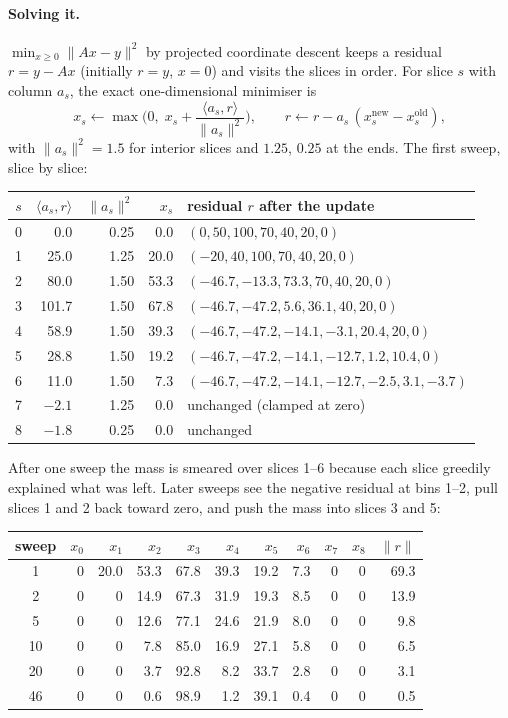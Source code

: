 \documentclass[11pt]{article}
\begin{document}
\paragraph{Solving it.} $\min_{x\ge0}\|Ax-y\|^2$ by projected coordinate descent keeps a residual $r=y-Ax$ (initially $r=y$, $x=0$) and visits the slices in order. For slice $s$ with column $a_s$, the exact one-dimensional minimiser is
\[
x_s \leftarrow \max\!\Big(0,\;x_s+\frac{\langle a_s,r\rangle}{\|a_s\|^2}\Big),\qquad r\leftarrow r-a_s\,(x_s^{\text{new}}-x_s^{\text{old}}),
\]
with $\|a_s\|^2=1.5$ for interior slices and $1.25$, $0.25$ at the ends. The first sweep, slice by slice:
\begin{center}\small\begin{tabular}{crrrl}\toprule
$s$ & $\langle a_s,r\rangle$ & $\|a_s\|^2$ & $x_s$ & residual $r$ after the update\\\midrule
0 & 0.0 & 0.25 & 0.0 & $(0,50,100,70,40,20,0)$\\
1 & 25.0 & 1.25 & 20.0 & $(-20,40,100,70,40,20,0)$\\
2 & 80.0 & 1.50 & 53.3 & $(-46.7,-13.3,73.3,70,40,20,0)$\\
3 & 101.7 & 1.50 & 67.8 & $(-46.7,-47.2,5.6,36.1,40,20,0)$\\
4 & 58.9 & 1.50 & 39.3 & $(-46.7,-47.2,-14.1,-3.1,20.4,20,0)$\\
5 & 28.8 & 1.50 & 19.2 & $(-46.7,-47.2,-14.1,-12.7,1.2,10.4,0)$\\
6 & 11.0 & 1.50 & 7.3 & $(-46.7,-47.2,-14.1,-12.7,-2.5,3.1,-3.7)$\\
7 & $-2.1$ & 1.25 & 0.0 & unchanged (clamped at zero)\\
8 & $-1.8$ & 0.25 & 0.0 & unchanged\\\bottomrule
\end{tabular}\end{center}
After one sweep the mass is smeared over slices 1--6 because each slice greedily explained what was left. Later sweeps see the negative residual at bins 1--2, pull slices 1 and 2 back toward zero, and push the mass into slices 3 and 5:
\begin{center}\small\begin{tabular}{crrrrrrrrrr}\toprule
sweep & $x_0$ & $x_1$ & $x_2$ & $x_3$ & $x_4$ & $x_5$ & $x_6$ & $x_7$ & $x_8$ & $\|r\|$\\\midrule
1 & 0 & 20.0 & 53.3 & 67.8 & 39.3 & 19.2 & 7.3 & 0 & 0 & 69.3\\
2 & 0 & 0 & 14.9 & 67.3 & 31.9 & 19.3 & 8.5 & 0 & 0 & 13.9\\
5 & 0 & 0 & 12.6 & 77.1 & 24.6 & 21.9 & 8.0 & 0 & 0 & 9.8\\
10 & 0 & 0 & 7.8 & 85.0 & 16.9 & 27.1 & 5.8 & 0 & 0 & 6.5\\
20 & 0 & 0 & 3.7 & 92.8 & 8.2 & 33.7 & 2.8 & 0 & 0 & 3.1\\
46 & 0 & 0 & 0.6 & 98.9 & 1.2 & 39.1 & 0.4 & 0 & 0 & 0.5\\\bottomrule
\end{tabular}\end{center}
\end{document}
